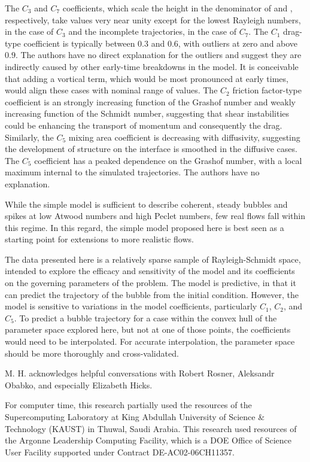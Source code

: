 The $C_3$ and $C_7$ coefficients, which scale the height in the denominator of  and , respectively, take values very near unity except for the lowest Rayleigh numbers, in the case of $C_3$ and the incomplete trajectories, in the case of $C_7$.
The $C_1$ drag-type coefficient is typically between $0.3$ and $0.6$, with outliers at zero and above $0.9$.
The authors have no direct explanation for the outliers and suggest they are indirectly caused by other early-time breakdowns in the model.
It is conceivable that adding a vortical term, which would be most pronounced at early times, would align these cases with nominal range of values.
The $C_2$ friction factor-type coefficient is an strongly increasing function of the Grashof number and weakly increasing function of the Schmidt number, suggesting that shear instabilities could be enhancing the transport of momentum and consequently the drag.
Similarly, the $C_5$ mixing area coefficient is decreasing with diffusivity, suggesting the development of structure on the interface is smoothed in the diffusive cases.
The $C_5$ coefficient has a peaked dependence on the Grashof number, with a local maximum internal to the simulated trajectories.
The authors have no explanation.

While the simple model is sufficient to describe coherent, steady bubbles and spikes at low Atwood numbers and high Peclet numbers, few real flows fall within this regime.
In this regard, the simple model proposed here is best seen as a starting point for extensions to more realistic flows.

The data presented here is a relatively sparse sample of Rayleigh-Schmidt space, intended to explore the efficacy and sensitivity of the model and its coefficients on the governing parameters of the problem.
The model is predictive, in that it can predict the trajectory of the bubble from the initial condition.
However, the model is sensitive to variations in the model coefficients, particularly $C_1$, $C_2$, and $C_5$.
To predict a bubble trajectory for a case within the convex hull of the parameter space explored here, but not at one of those points, the coefficients would need to be interpolated.
For accurate interpolation, the parameter space should be more thoroughly and cross-validated.

\begin{acknowledgements}
M. H. acknowledges helpful conversations with Robert Rosner, Aleksandr Obabko, and especially Elizabeth Hicks.

For computer time, this research partially used the resources of the
Supercomputing Laboratory at King Abdullah University of Science \& Technology
 (KAUST) in Thuwal, Saudi Arabia.
This research used resources of the Argonne Leadership Computing Facility, which
is a DOE Office of Science User Facility supported under Contract DE-AC02-06CH11357.
\end{acknowledgements}
